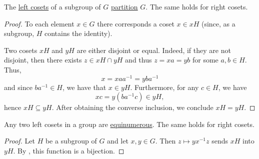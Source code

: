 \begin{lemma}\label{thm:group_coset_partition}
  The \hyperref[def:group_cosets]{left cosets} of a subgroup of \( G \) \hyperref[def:set_partition]{partition} \( G \). The same holds for right cosets.
\end{lemma}
\begin{proof}
  To each element \( x \in G \) there corresponds a coset \( x \in xH \) (since, as a subgroup, \( H \) contains the identity).

  Two cosets \( xH \) and \( yH \) are either disjoint or equal. Indeed, if they are not disjoint, then there exists \( z \in xH \cap yH \) and thus \( z = xa = yb \) for some \( a, b \in H \). Thus,
  \begin{equation*}
    x = x a a^{-1} = y b a^{-1}
  \end{equation*}
  and since \( b a^{-1} \in H \), we have that \( x \in yH \). Furthermore, for any \( c \in H \), we have
  \begin{equation*}
    xc = y(b a^{-1} c) \in yH,
  \end{equation*}
  hence \( xH \subseteq yH \). After obtaining the converse inclusion, we conclude \( xH = yH \).
\end{proof}

\begin{lemma}\label{thm:group_coset_bijection}
  Any two left cosets in a group are \hyperref[def:equinumerosity]{equinumerous}. The same holds for right cosets.
\end{lemma}
\begin{proof}
  Let \( H \) be a subgroup of \( G \) and let \( x, y \in G \). Then \( z \mapsto y x^{-1} z \) sends \( xH \) into \( yH \). By , this function is a bijection.
\end{proof}

